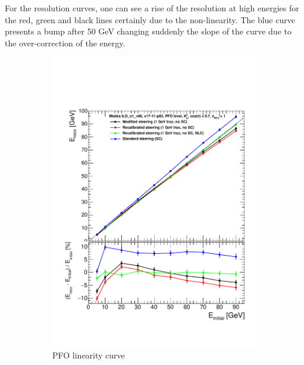 For the resolution curves, one can see a rise of the resolution at high energies for the red, green and black lines certainly due to the non-linearity. The blue curve presents a bump after 50 GeV changing suddenly the slope of the curve due to the over-correction of the energy.\\

\begin{figure}[htbp!]
  \centering
  \begin{subfigure}[t]{0.45\textwidth}
    \centering
    \includegraphics[width=1\linewidth]{../Thesis_Plots/ILD/NoSmearing/Plots_Comparison/Comparison_linearity_Curves_PFO}
    \caption{PFO linearity curve} \label{fig:linpfo}
  \end{subfigure}
  \hfill
  \begin{subfigure}[t]{0.45\textwidth}
    \centering

\end{subfigure}
\end{figure}
